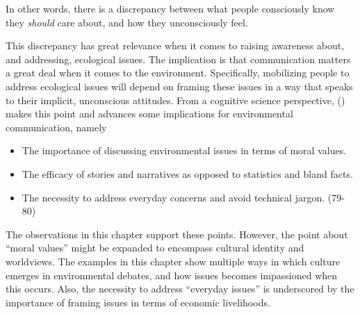 In other words, there is a discrepancy between what people consciously know they \textit{should} care about, and how they unconsciously feel. 

This discrepancy has great relevance when it comes to raising awareness about, and addressing, ecological issues. The implication is that communication matters a great deal when it comes to the environment. Specifically, mobilizing people to address ecological issues will depend on framing these issues in a way that speaks to their implicit, unconscious attitudes. From a cognitive science perspective, \citeauthor{Lakoff2010a} (\citeyear{Lakoff2010a}) makes this point and advances some implications for environmental communication, namely

\begin{itemize}
\item The importance of discussing environmental issues in terms of moral values.
\item The efficacy of stories and narratives as opposed to statistics and bland facts.
\item The necessity to address everyday concerns and avoid technical jargon. (79-80) 
\end{itemize}

The observations in this chapter support these points. However, the point about ``moral values'' might be expanded to encompass cultural identity and worldviews. The examples in this chapter show multiple ways in which culture emerges in environmental debates, and how issues becomes impassioned when this occurs. Also, the necessity to address ``everyday issues'' is underscored by the importance of framing issues in terms of economic livelihoods.     
